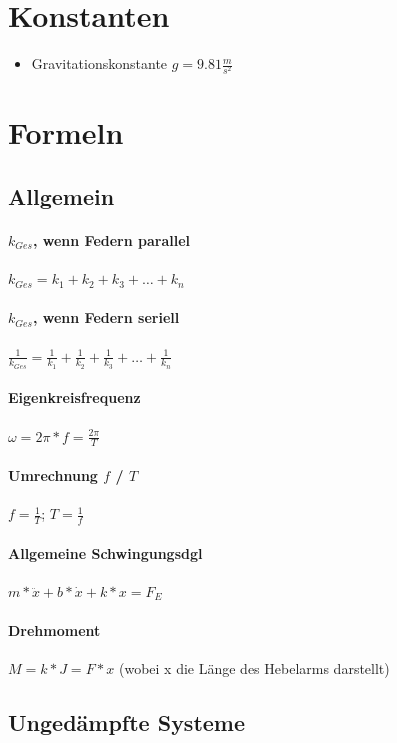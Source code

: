 \documentclass[12pt, a4paper]{scrreprt}
\begin{document}
\section{Konstanten}

\begin{itemize}
\item Gravitationskonstante \(g = 9.81 \frac{m}{s^2}\)
\end{itemize}


\section{Formeln}


\subsection{Allgemein}

\paragraph{\(k_{Ges}\), wenn Federn parallel} \dotfill \(k_{Ges}=k_1+k_2+k_3+ \dots +k_n\)
\paragraph{\(k_{Ges}\), wenn Federn seriell} \dotfill \(\frac{1}{k_{Ges}}=\frac{1}{k_1}+\frac{1}{k_2}+\frac{1}{k_3}+ \dots +\frac{1}{k_n}\)
\paragraph{Eigenkreisfrequenz} \dotfill \(\omega=2\pi*f=\frac{2\pi}{T}\)
\paragraph{Umrechnung \(f\) / \(T\)}\dotfill \(f=\frac{1}{T}\); \(T=\frac{1}{f}\)
\paragraph{Allgemeine Schwingungsdgl} \dotfill \(m* \ddot x + b*\dot x + k *x=F_E\)
\paragraph{Drehmoment} \dotfill \(M = k * J = F * x\) (wobei x die Länge des Hebelarms darstellt)


\subsection{Ungedämpfte Systeme}
\end{document}
